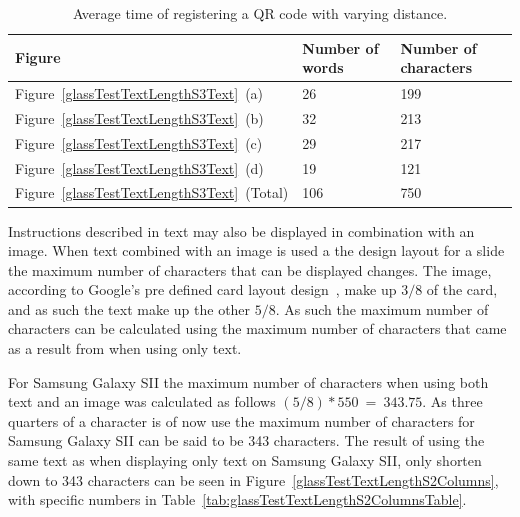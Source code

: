 	\begin{table}[ht!]
    		\caption{Average time of registering a QR code with varying distance.} \label{tab:glassTestTextLengthS3TextTable}
		\centering \begin{tabularx}{\textwidth}{l|X|X} \hline
		\textbf{Figure} & \textbf{Number of words} & \textbf{Number of characters} \\ \hline \hline
       
		Figure~\ref{glassTestTextLengthS3Text}~(a)	&26	&199	\\ \hline
		Figure~\ref{glassTestTextLengthS3Text}~(b)	&32	&213	\\ \hline
		Figure~\ref{glassTestTextLengthS3Text}~(c)	&29	&217	\\ \hline
		Figure~\ref{glassTestTextLengthS3Text}~(d)	&19	&121	\\ \hline
		Figure~\ref{glassTestTextLengthS3Text}~(Total)	&106	&750	\\ \hline
		
		\end{tabularx}
	\end{table}

Instructions described in text may also be displayed in combination with an image. When text combined with an image is used a the design layout for a slide the maximum number of characters that can be displayed changes. The image, according to Google's pre defined card layout design~\cite{glassDesignStyle}, make up \(3/8\) of the card, and as such the text make up the other \(5/8\). As such the maximum number of characters can be calculated using the maximum number of characters that came as a result from when using only text.

For Samsung Galaxy SII the maximum number of characters when using both text and an image was calculated as follows \((5/8)*550~=~343.75\). As three quarters of a character is of now use the maximum number of characters for Samsung Galaxy SII can be said to be 343 characters. The result of using the same text as when displaying only text on Samsung Galaxy SII, only shorten down to 343 characters can be seen in Figure~\ref{glassTestTextLengthS2Columns}, with specific numbers in Table~\ref{tab:glassTestTextLengthS2ColumnsTable}.

